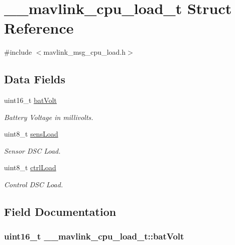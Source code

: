 \hypertarget{struct____mavlink__cpu__load__t}{\section{\+\_\+\+\_\+mavlink\+\_\+cpu\+\_\+load\+\_\+t Struct Reference}
\label{struct____mavlink__cpu__load__t}
}


{\ttfamily \#include $<$mavlink\+\_\+msg\+\_\+cpu\+\_\+load.\+h$>$}

\subsection*{Data Fields}
\begin{DoxyCompactItemize}
\item 
uint16\+\_\+t \hyperlink{struct____mavlink__cpu__load__t_aadd41fd79c335c6b5e89959fbc00bddf}{bat\+Volt}
\begin{DoxyCompactList}\small\item\em Battery Voltage in millivolts. \end{DoxyCompactList}\item 
uint8\+\_\+t \hyperlink{struct____mavlink__cpu__load__t_a57abf05fe0f75189ca7963c38419a006}{sens\+Load}
\begin{DoxyCompactList}\small\item\em Sensor D\+S\+C Load. \end{DoxyCompactList}\item 
uint8\+\_\+t \hyperlink{struct____mavlink__cpu__load__t_a2e999c8df746bb5ab55ca5ed6e5c701b}{ctrl\+Load}
\begin{DoxyCompactList}\small\item\em Control D\+S\+C Load. \end{DoxyCompactList}\end{DoxyCompactItemize}


\subsection{Field Documentation}
\hypertarget{struct____mavlink__cpu__load__t_aadd41fd79c335c6b5e89959fbc00bddf}{
\subsubsection[{bat\+Volt}]{\setlength{\rightskip}{0pt plus 5cm}uint16\+\_\+t \+\_\+\+\_\+mavlink\+\_\+cpu\+\_\+load\+\_\+t\+::bat\+Volt}}\label{struct____mavlink__cpu__load__t_aadd41fd79c335c6b5e89959fbc00bddf}


